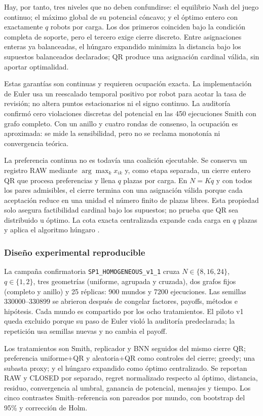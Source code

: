 Hay, por tanto, tres niveles que no deben confundirse: el equilibrio Nash del juego
continuo; el máximo global de su potencial cóncavo; y el óptimo entero con exactamente
$q$ robots por carga. Los dos primeros coinciden bajo la condición completa de soporte,
pero el tercero exige cierre discreto. Entre asignaciones enteras ya balanceadas, el
húngaro expandido minimiza la distancia bajo los supuestos balanceados declarados; QR produce una asignación cardinal válida, sin aportar optimalidad.

Estas garantías son continuas y requieren ocupación exacta. La implementación de
Euler usa un reescalado temporal positivo por robot para acotar la tasa de revisión;
no altera puntos estacionarios ni el signo continuo. La auditoría confirmó cero
violaciones discretas del potencial en las 450 ejecuciones Smith con grafo completo.
Con un anillo y cuatro rondas de consenso, la ocupación es aproximada: se mide la
sensibilidad, pero no se reclama monotonía ni convergencia teórica.

La preferencia continua no es todavía una coalición ejecutable. Se conserva un
registro RAW mediante $\arg\max_kx_{ik}$ y, como etapa separada, un cierre entero
QR que procesa preferencias y llena $q$ plazas por carga. En $N=Kq$ y con todos
los pares admisibles, el cierre termina con una asignación válida porque cada
aceptación reduce en una unidad el número finito de plazas libres. Esta propiedad
solo asegura factibilidad cardinal bajo los supuestos; no prueba que QR sea distribuido u óptimo.
La cota exacta centralizada expande cada carga en $q$ plazas y aplica el algoritmo
húngaro \citep{kuhn1955hungarian}.

\subsubsection{Diseño experimental reproducible}

La campaña confirmatoria \texttt{SP1\_HOMOGENEOUS\_v1\_1} cruza
$N\in\{8,16,24\}$, $q\in\{1,2\}$, tres geometrías (uniforme, agrupada y
cruzada), dos grafos fijos (completo y anillo) y 25 réplicas: 900 mundos y
7200 ejecuciones. Las semillas 330000--330899 se abrieron después de congelar
factores, payoffs, métodos e hipótesis. Cada mundo es compartido por los ocho
tratamientos. El piloto v1 queda excluido porque su paso de Euler violó la
auditoría predeclarada; la repetición usa semillas nuevas y no cambia el payoff.

Los tratamientos son Smith, replicador y BNN seguidos del mismo cierre QR;
preferencia uniforme+QR y aleatoria+QR como controles del cierre; greedy;
una subasta proxy; y el húngaro expandido como óptimo centralizado. Se reportan
RAW y CLOSED por separado, regret normalizado respecto al óptimo, distancia,
residuo, convergencia al umbral, ganancia de potencial, mensajes y tiempo.
Los cinco contrastes Smith--referencia son pareados por mundo, con bootstrap del
95\% y corrección de Holm.

